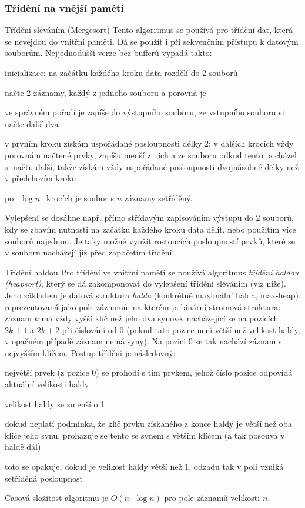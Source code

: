 \subsubsection*{Třídění na vnější paměti}

\begin{algoritmusN}{Třídění sléváním (Mergesort)}
Tento algoritmus se používá pro třídění dat, která se nevejdou do vnitřní paměti. Dá se použít i při sekvenčním přístupu k datovým souborům. Nejjednodušší verze bez bufferů vypadá takto:
\begin{pitemize}
    \item inicializace: na začátku každého kroku data rozdělí do 2 souborů
    \item načte 2 záznamy, každý z jednoho souboru a porovná je
    \item ve správném pořadí je zapíše do výstupního souboru, ze vstupního souboru si načte další dva
    \item v prvním kroku získám uspořádané posloupnosti délky 2; v dalších krocích vždy porovnám načtené prvky, zapíšu menší z nich a ze souboru odkud tento pocházel si načtu další, takže získám vždy uspořádané posloupnosti dvojnásobné délky než v předchozím kroku
    \item po $\lceil\log n\rceil$ krocích je soubor s $n$ záznamy setříděný.
\end{pitemize}
Vylepšení se dosáhne např. přímo střídavým zapisováním výstupu do 2 souborů, kdy se zbavím nutnosti na začátku každého kroku data dělit, nebo použitím více souborů najednou. Je taky možné využít rostoucích posloupností prvků, které se v souboru nacházejí již před započetím třídění.
\end{algoritmusN}

\begin{algoritmusN}{Třídění haldou}
Pro třídění ve vnitřní paměti se používá algoritmus \emph{třídění haldou (heapsort)}, který se dá zakomponovat do vylepšení třídění sléváním (viz níže). Jeho základem je datová struktura \emph{halda} (konkrétně maximální halda, max-heap), reprezentovaná jako pole záznamů, na kterém je binární stromová struktura: záznam $k$ má vždy vyšší klíč než jeho dva synové, nacházející se na pozicích $2k+1$ a $2k+2$ při číslování od $0$ (pokud tato pozice není větší než velikost haldy, v opačném případě záznam nemá syny). Na pozici $0$ se tak nachází záznam s nejvyšším klíčem. Postup třídění je následovný:
\begin{pitemize}
    \item největší prvek (z pozice $0$) se prohodí s tím prvkem, jehož číslo pozice odpovídá aktuální velikosti haldy
    \item velikost haldy se zmenší o 1
    \item dokud neplatí podmínka, že klíč prvku získaného z konce haldy je větší než oba klíče jeho synů, prohazuje se tento se synem s větším klíčem (a tak posouvá v haldě dál)
    \item toto se opakuje, dokud je velikost haldy větší než 1, odzadu tak v poli vzniká setříděná posloupnost
\end{pitemize}
Časová složitost algoritmu je $O(n\cdot\log n)$ pro pole záznamů velikosti $n$.
\end{algoritmusN}

